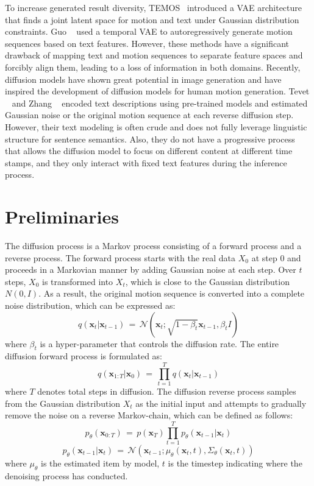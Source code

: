 \documentclass[10pt,twocolumn,letterpaper]{article}
\begin{document}
To increase generated result diversity, TEMOS~\cite{petrovich2022temos} introduced a VAE architecture that finds a joint latent space for motion and text under Gaussian distribution constraints. Guo \etal~\cite{guo2022generating} used a temporal VAE to autoregressively generate motion sequences based on text features. However, these methods have a significant drawback of mapping text and motion sequences to separate feature spaces and forcibly align them, leading to a loss of information in both domains. Recently, diffusion models have shown great potential in image generation and have inspired the development of diffusion models for human motion generation. Tevet \etal~\cite{tevet2022human} and Zhang \etal~\cite{zhang2022motiondiffuse} encoded text descriptions using pre-trained models and estimated Gaussian noise or the original motion sequence at each reverse diffusion step. However, their text modeling is often crude and does not fully leverage linguistic structure for sentence semantics. Also, they do not have a progressive process that allows the diffusion model to focus on different content at different time stamps, and they only interact with fixed text features during the inference process.

\section{Preliminaries}

The diffusion process is a Markov process consisting of a forward process and a reverse process.
The forward process starts with the real data $X_0$ at step 0 and proceeds in a Markovian manner by adding Gaussian noise at each step. Over $t$ steps, $X_0$ is transformed into $X_t$, which is close to the Gaussian distribution $N(0, I)$. As a result, the original motion sequence is converted into a complete noise distribution, which can be expressed as:
\begin{equation}
        q(\mathbf{x}_t \vert \mathbf{x}_{t-1}) \,=\, \mathcal{N}(\mathbf{x}_t; \sqrt{1-\beta_t}\mathbf{x}_{t-1}, \beta_t I)
\end{equation}
where $\beta_t$ is a hyper-parameter that controls the diffusion rate. The entire diffusion forward process is formulated as:
\begin{equation}
        q(\mathbf{x}_{1:T} \vert \mathbf{x}_0) \,=\, \prod_{t=1}^{T} q(\mathbf{x}_t \vert \mathbf{x}_{t-1})
\end{equation}
where $T$ denotes total steps in diffusion. The diffusion reverse process samples from the Gaussian distribution $X_t$ as the initial input and attempts to gradually remove the noise on a reverse Markov-chain, which  can be defined as follows:
\begin{equation}
        p_{\theta}(\mathbf{x}_{0:T}) \,=\, p(\mathbf{x}_{T}) \prod_{t=1}^{T}p_{\theta}(\mathbf{x}_{t-1} \vert \mathbf{x}_{t})
\end{equation}
\begin{equation}
        p_{\theta}(\mathbf{x}_{t-1} \vert \mathbf{x}_{t}) \,=\, \mathcal{N}(\mathbf{x}_{t-1}; \mu_\theta(\mathbf{x}_{t}, t), \Sigma_\theta(\mathbf{x}_{t}, t))
\end{equation}
where $\mu_\theta$ is the estimated item by model, $t$ is the timestep indicating where the denoising process has conducted.
\end{document}
